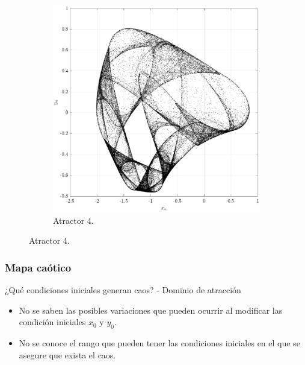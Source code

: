 \documentclass[10pt]{beamer}
\begin{document}
\begin{frame}
\begin{figure}[hbtp]
\begin{subfigure}[b]{0.475\textwidth}
                \includegraphics[width=\textwidth,trim=70 0 70 0,clip]{G4_map4}
                \caption{Atractor 4.}    
                \label{fig:mapa_4}
            \end{subfigure}
        \end{figure}
\end{frame}


\begin{frame}
    \frametitle{Mapa caótico}
     \begin{block}{¿Qué condiciones iniciales generan caos? - Dominio de atracción}
        \justifying
        \begin{itemize}
            \item No se saben las posibles variaciones que pueden ocurrir al modificar las condición iniciales $x_{0}$ y $y_{0}$.
            \item No se conoce el rango que pueden tener las condiciones iniciales en el que se asegure que exista el caos.
        \end{itemize}
	\end{block}
\end{frame}
\end{document}
